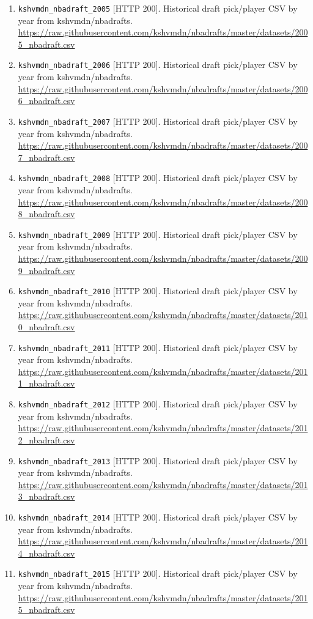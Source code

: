 \documentclass[11pt]{article}
\begin{document}
\begin{enumerate}[leftmargin=*, itemsep=2pt]
\item \texttt{kshvmdn\_nbadraft\_2005} [HTTP 200]. Historical draft pick/player CSV by year from kshvmdn/nbadrafts. \url{https://raw.githubusercontent.com/kshvmdn/nbadrafts/master/datasets/2005_nbadraft.csv}
\item \texttt{kshvmdn\_nbadraft\_2006} [HTTP 200]. Historical draft pick/player CSV by year from kshvmdn/nbadrafts. \url{https://raw.githubusercontent.com/kshvmdn/nbadrafts/master/datasets/2006_nbadraft.csv}
\item \texttt{kshvmdn\_nbadraft\_2007} [HTTP 200]. Historical draft pick/player CSV by year from kshvmdn/nbadrafts. \url{https://raw.githubusercontent.com/kshvmdn/nbadrafts/master/datasets/2007_nbadraft.csv}
\item \texttt{kshvmdn\_nbadraft\_2008} [HTTP 200]. Historical draft pick/player CSV by year from kshvmdn/nbadrafts. \url{https://raw.githubusercontent.com/kshvmdn/nbadrafts/master/datasets/2008_nbadraft.csv}
\item \texttt{kshvmdn\_nbadraft\_2009} [HTTP 200]. Historical draft pick/player CSV by year from kshvmdn/nbadrafts. \url{https://raw.githubusercontent.com/kshvmdn/nbadrafts/master/datasets/2009_nbadraft.csv}
\item \texttt{kshvmdn\_nbadraft\_2010} [HTTP 200]. Historical draft pick/player CSV by year from kshvmdn/nbadrafts. \url{https://raw.githubusercontent.com/kshvmdn/nbadrafts/master/datasets/2010_nbadraft.csv}
\item \texttt{kshvmdn\_nbadraft\_2011} [HTTP 200]. Historical draft pick/player CSV by year from kshvmdn/nbadrafts. \url{https://raw.githubusercontent.com/kshvmdn/nbadrafts/master/datasets/2011_nbadraft.csv}
\item \texttt{kshvmdn\_nbadraft\_2012} [HTTP 200]. Historical draft pick/player CSV by year from kshvmdn/nbadrafts. \url{https://raw.githubusercontent.com/kshvmdn/nbadrafts/master/datasets/2012_nbadraft.csv}
\item \texttt{kshvmdn\_nbadraft\_2013} [HTTP 200]. Historical draft pick/player CSV by year from kshvmdn/nbadrafts. \url{https://raw.githubusercontent.com/kshvmdn/nbadrafts/master/datasets/2013_nbadraft.csv}
\item \texttt{kshvmdn\_nbadraft\_2014} [HTTP 200]. Historical draft pick/player CSV by year from kshvmdn/nbadrafts. \url{https://raw.githubusercontent.com/kshvmdn/nbadrafts/master/datasets/2014_nbadraft.csv}
\item \texttt{kshvmdn\_nbadraft\_2015} [HTTP 200]. Historical draft pick/player CSV by year from kshvmdn/nbadrafts. \url{https://raw.githubusercontent.com/kshvmdn/nbadrafts/master/datasets/2015_nbadraft.csv}

\end{enumerate}
\end{document}
